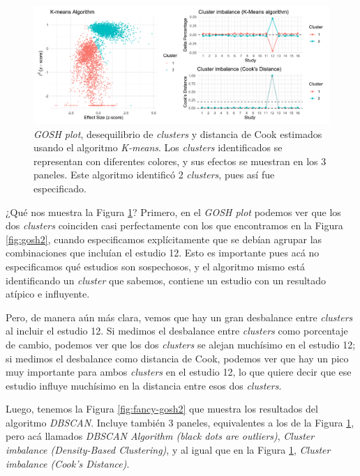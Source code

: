 \documentclass[
  bookmarksnumbered]{article}
\begin{document}
\begin{figure}

{\centering \includegraphics[height=170px]{images/fancy_gosh_P1} 

}

\caption{\textit{GOSH plot}, desequilibrio de \textit{clusters} y distancia de Cook estimados usando el algoritmo \textit{K-means}. Los \textit{clusters} identificados se representan con diferentes colores, y sus efectos se muestran en los 3 paneles. Este algoritmo identificó 2 \textit{clusters}, pues así fue especificado.}\label{fig:fancy-gosh1}
\end{figure}

¿Qué nos muestra la Figura \ref{fig:fancy-gosh1}? Primero, en el \emph{GOSH plot} podemos ver que los dos \emph{clusters} coinciden casi perfectamente con los que encontramos en la Figura \ref{fig:gosh2}, cuando especificamos explícitamente que se debían agrupar las combinaciones que incluían el estudio 12. Esto es importante pues acá no especificamos qué estudios son sospechosos, y el algoritmo mismo está identificando un \emph{cluster} que sabemos, contiene un estudio con un resultado atípico e influyente.

Pero, de manera aún más clara, vemos que hay un gran desbalance entre \emph{clusters} al incluir el estudio 12. Si medimos el desbalance entre \emph{clusters} como porcentaje de cambio, podemos ver que los dos \emph{clusters} se alejan muchísimo en el estudio 12; si medimos el desbalance como distancia de Cook, podemos ver que hay un pico muy importante para ambos \emph{clusters} en el estudio 12, lo que quiere decir que ese estudio influye muchísimo en la distancia entre esos dos \emph{clusters}.

Luego, tenemos la Figura \ref{fig:fancy-gosh2} que muestra los resultados del algoritmo \emph{DBSCAN}. Incluye también 3 paneles, equivalentes a los de la Figura \ref{fig:fancy-gosh1}, pero acá llamados \emph{DBSCAN Algorithm (black dots are outliers)}, \emph{Cluster imbalance (Density-Based Clustering)}, y al igual que en la Figura \ref{fig:fancy-gosh1}, \emph{Cluster imbalance (Cook's Distance)}.
\end{document}
